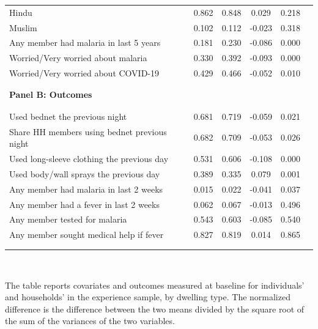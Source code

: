 {\begin{tabular}{lccccc}
Hindu & 0.862 & 0.848 & 0.029 & 0.218 & \\
Muslim & 0.102 & 0.112 & -0.023 & 0.318 & \\
Any member had malaria in last 5 years & 0.181 & 0.230 & -0.086 & 0.000 & \\
Worried/Very worried about malaria & 0.330 & 0.392 & -0.093 & 0.000 & \\
Worried/Very worried about COVID-19 & 0.429 & 0.466 & -0.052 & 0.010 & \\
\hline \hline \\[-5.5ex] &  &  &  &  & \\
\textbf{Panel B: Outcomes} &  &  &  &  & \\
 &  &  &  &  & \\[-5ex]\\
Used bednet the previous night & 0.681 & 0.719 & -0.059 & 0.021 & \\
Share HH members using bednet previous night & 0.682 & 0.709 & -0.053 & 0.026 & \\
Used long-sleeve clothing the previous day & 0.531 & 0.606 & -0.108 & 0.000 & \\
Used body/wall sprays the previous day & 0.389 & 0.335 & 0.079 & 0.001 & \\
Any member had malaria in last 2 weeks & 0.015 & 0.022 & -0.041 & 0.037 & \\
Any member had a fever in last 2 weeks & 0.062 & 0.067 & -0.013 & 0.496 & \\
Any member tested for malaria & 0.543 & 0.603 & -0.085 & 0.540 & \\
Any member sought medical help if fever & 0.827 & 0.819 & 0.014 & 0.865 & \\
\hline \\[-5.1ex] &  &  &  &  & \\
\hline\end{tabular}
}%
\\
\begin{minipage}{1\linewidth}
  \scriptsize The table reports covariates and outcomes measured at baseline for individuals' and households' in the experience sample, by dwelling type. The normalized difference is the difference between the two means divided by the square root of the sum of the variances of the two variables.\\
  \end{minipage} 
